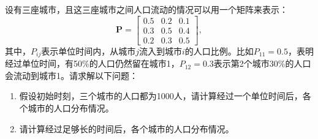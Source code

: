 \begin{example}
    设有三座城市，且这三座城市之间人口流动的情况可以用一个矩阵来表示：
    \[
        \mathbf{P} =
        \begin{bmatrix}
            0.5 & 0.2 & 0.1 \\
            0.3 & 0.5 & 0.4 \\
            0.2 & 0.3 & 0.5
        \end{bmatrix},
    \]
    其中，\( P_{ij} \)表示单位时间内，从城市\( j \)流入到城市\( i \)的人口比例。比如\( P_{11} = 0.5 \)，表明经过单位时间，有50\%的人口仍然留在城市1，\( P_{12} = 0.3 \)表示第2个城市30\%的人口会流动到城市1。请求解以下问题：
    \begin{enumerate}
        \item 假设初始时刻，三个城市的人口都为1000人，请计算经过一个单位时间后，各个城市的人口分布情况。
        \item 请计算经过足够长的时间后，各个城市的人口分布情况。
    \end{enumerate}
\end{example}
